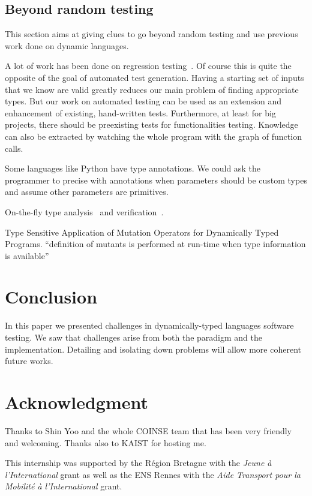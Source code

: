 \documentclass{llncs2e/llncs}
\begin{document}
\subsection{Beyond random testing}

This section aims at giving clues to go beyond random testing and use previous
work done on dynamic languages.

A lot of work has been done on regression
testing~\cite{gligoric2011smutant,haupt2011type,steinert2010continuous,yoo2012regression}.
Of course this is quite the opposite of the goal of automated test generation.
Having a starting set of inputs that we know are valid greatly reduces our main
problem of finding appropriate types. But our work on automated testing can be
used as an extension and enhancement of existing, hand-written tests.
Furthermore, at least for big projects, there should be preexisting tests for
functionalities testing. Knowledge can also be extracted by watching the whole
program with the graph of function calls.

Some languages like Python have type annotations. We could ask the programmer to
precise with annotations when parameters should be custom types and assume other
parameters are primitives.

On-the-fly type analysis~\cite{chambers1991iterative} and
verification~\cite{chugh2012nested}.

Type Sensitive Application of Mutation Operators for Dynamically Typed Programs.
``definition of mutants is performed at run-time when type information is
available''~\cite{bottaci2010type}


\section{Conclusion}
\label{conclusion}

In this paper we presented challenges in dynamically-typed languages software
testing. We saw that challenges arise from both the paradigm and the
implementation. Detailing and isolating down problems will allow more coherent
future works.


\section*{Acknowledgment}
Thanks to Shin Yoo and the whole COINSE team that has been very friendly and
welcoming. Thanks also to KAIST for hosting me.

This internship was supported by the R\'egion Bretagne with the \textit{Jeune
\`a l'International} grant as well as the ENS Rennes with the \textit{Aide
Transport pour la Mobilit\'e \`a l'International} grant.



\end{document}
